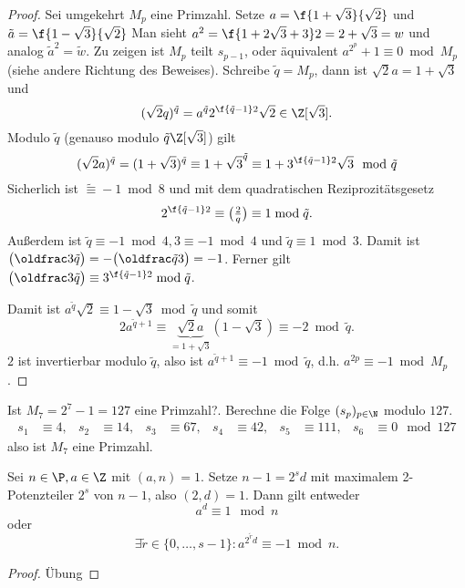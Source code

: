 \begin{st}
\begin{proof}
		Sei umgekehrt $M_p$ eine Primzahl.
		Setze $a = \f{1 + \sqrt{3}}{\sqrt{2}}$ und $\tilde a = \f{1 - \sqrt{3}}{\sqrt{2}}$
		Man sieht $a^2 = \f{1 + 2\sqrt{3} + 3}2 = 2 + \sqrt{3} = w$ und analog $\tilde a^2 = \tilde w$.
		Zu zeigen ist $M_p$ teilt $s_{p-1}$, oder äquivalent $a^{2^p} + 1 \equiv 0 \bmod M_p$ (siehe andere Richtung des Beweises).
		Schreibe $\tilde q = M_p$, dann ist $\sqrt{2} a = 1 + \sqrt{3}$ und
		\[
			(\sqrt{2} q)^{\tilde q} = a^{\tilde q} 2^{\f{\tilde q - 1}2} \sqrt{2}
			\in \Z[\sqrt{3}].
		\]
		Modulo $\tilde q$ (genauso modulo $\tilde q \Z[\sqrt{3}]$) gilt
		\[
			(\sqrt 2 a)^{\tilde q}
			= (1 + \sqrt 3)^{\tilde q}
			\equiv 1 + \sqrt{3}^{\tilde q}
			\equiv 1 + 3^{\f{\tilde q -1}2} \sqrt{3}
			\mod \tilde q
		\]
		Sicherlich ist $\tilde \equiv -1 \bmod 8$ und mit dem quadratischen Reziprozitätsgesetz
		\[
			2^{\f{\tilde q - 1}2} \equiv \legsym{2}{q}
			\equiv 1 \bmod \tilde q.
		\]
		Außerdem ist $\tilde q \equiv -1 \bmod 4, 3 \equiv -1 \bmod 4$ und $\tilde q \equiv 1 \bmod 3$.
		Damit ist $\legsym{3}{\tilde q} = - \legsym{\tilde q}{3} = -1$.
		Ferner gilt $\legsym{3}{\tilde q} \equiv 3^{\f{\tilde q-1}2} \bmod \tilde q$.

		Damit ist $a^{\tilde q} \sqrt{2} \equiv 1 - \sqrt{3} \bmod \tilde q$ und somit
		\[
			2 a^{\tilde q + 1}
			\equiv \underbrace{\sqrt{2} a}_{=1+\sqrt{3}} (1 - \sqrt{3})
			\equiv -2 \bmod \tilde q.
		\]
		$2$ ist invertierbar modulo $\tilde q$, also ist $a^{\tilde q + 1} \equiv -1 \bmod \tilde q$, d.h. $a^{2p} \equiv -1 \bmod M_p$.
	\end{proof}
\end{st}

\begin{ex} \label{3.18}
	Ist $M_7 = 2^7 - 1 = 127$ eine Primzahl?.
	Berechne die Folge $(s_p)_{p\in \N}$ modulo $127$.
	\begin{align*}
		s_1 &\equiv 4, &
		s_2 &\equiv 14, &
		s_3 &\equiv 67, &
		s_4 &\equiv 42, &
		s_5 &\equiv 111, &
		s_6 &\equiv 0
		\mod 127
	\end{align*}
	also ist $M_7$ eine Primzahl.
\end{ex}

\begin{prop} \label{3.19}
	Sei $n \in \P, a \in \Z$ mit $(a, n) = 1$.
	Setze $n - 1 = 2^s d$ mit maximalem 2-Potenzteiler $2^s$ von $n-1$, also $(2, d) = 1$.
	Dann gilt entweder
	\[
		a^d \equiv 1 \mod n
	\]
	oder
	\[
		\exists \tilde r \in \{0, \dotsc, s-1\} :
		a^{2^{\tilde r} d} \equiv -1 \bmod n.
	\]
	\begin{proof}
		Übung
	\end{proof}
\end{prop}

